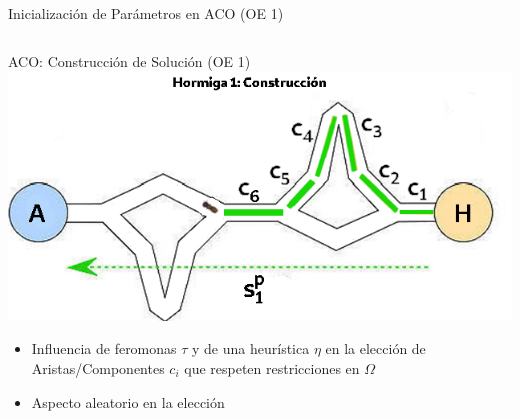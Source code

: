 \begin{frame}{Inicializaci\'on de Par\'ametros en ACO (OE 1)}
\begin{columns}
\begin{column}{0.55\textwidth}
        \end{column}
    \end{columns}
\end{frame}

\begin{frame}{ACO: Construcci\'on de Soluci\'on (OE 1)}
\centering
\includegraphics[scale=0.4]{Pictures/ACO-ant-Constr.png}
\begin{itemize}
    \item Influencia de feromonas $\tau$ y de una heur\'istica $\eta$ en la elecci\'on de Aristas/Componentes $c_i$ que respeten restricciones en $\Omega$
    \item Aspecto aleatorio en la elecci\'on
\end{itemize}
\end{frame}



